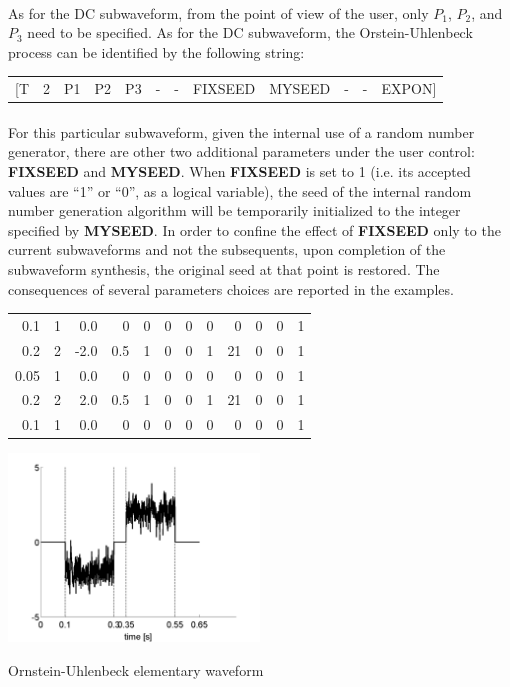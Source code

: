 \paragraph{}
As for the DC subwaveform, from the point of view of the user, only
\textbf{$P_1$}, \textbf{$P_2$}, and \textbf{$P_3$} need to be specified. As for the DC subwaveform, the
Orstein-Uhlenbeck process can be identified by the following string:

\begin{center}
\footnotesize\ttfamily
\begin{tabular}{rrrrrrrrrrrr}
[T & 2 & P1 & P2 & P3 & - & - & FIXSEED & MYSEED & - & - & EXPON]
\end{tabular}
\end{center}

\paragraph{}
For this particular subwaveform, given the internal use of a random number generator, there are other two additional
parameters under the user control: \textbf{FIXSEED }and \textbf{MYSEED}. When \textbf{FIXSEED} is set to 1 (i.e. its
accepted values are ``1'' or ``0'', as a logical variable), the seed of the internal random number generation algorithm
will be temporarily initialized to the integer specified by \textbf{MYSEED}. In order to confine the effect of
\textbf{FIXSEED }only to the current subwaveforms and not the subsequents, upon completion of the subwaveform
synthesis, the original seed at that point is restored. The consequences of several parameters choices are reported in
the examples.

\begin{example}
\begin{center}
\footnotesize\ttfamily
\begin{tabular}{rrrrrrrrrrrr}
0.1 & 1 & 0.0 & 0 & 0 & 0 & 0 & 0 & 0 & 0 & 0 & 1 \\
0.2 & 2 & -2.0 & 0.5 & 1 & 0 & 0 & 1 & 21 & 0 & 0 & 1 \\
0.05 & 1 & 0.0 & 0 & 0 & 0 & 0 & 0 & 0 & 0 & 0 & 1 \\
0.2 & 2 & 2.0 & 0.5 & 1 & 0 & 0 & 1 & 21 & 0 & 0 & 1 \\
0.1 & 1 & 0.0 & 0 & 0 & 0 & 0 & 0 & 0 & 0 & 0 & 1 \\
\end{tabular}
\includegraphics[width=0.5\textwidth]{stimgen/Documentation2009-img003.png}
\end{center}
\caption{Ornstein-Uhlenbeck elementary waveform}
\end{example}

